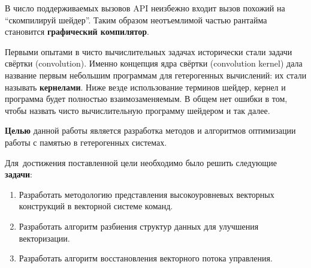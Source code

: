 В число поддерживаемых вызовов API неизбежно входит вызов похожий на ``скомпилируй шейдер''. Таким образом неотъемлимой частью рантайма становится \textbf{графический компилятор}.

Первыми опытами в чисто вычислительных задачах исторически стали задачи свёртки (convolution). Именно концепция ядра свёртки (convolution kernel) дала название первым небольшим программам для гетерогенных вычислений: их стали называть \textbf{кернелами}. Ниже везде использование терминов шейдер, кернел и программа будет полностью взаимозаменяемым. В общем нет ошибки в том, чтобы назвать чисто вычислительную программу шейдером и так далее.

\textbf{Целью} данной работы является разработка методов и алгоритмов оптимизации работы с памятью в гетерогенных системах.

Для~достижения поставленной цели необходимо было решить следующие \textbf{задачи}:
\begin{enumerate}[beginpenalty=10000] %
  \item Разработать методологию представления высокоуровневых векторных конструкций в векторной системе команд.
  \item Разработать алгоритм разбиения структур данных для улучшения векторизации.
  \item Разработать алгоритм восстановления векторного потока управления.
\end{enumerate}

